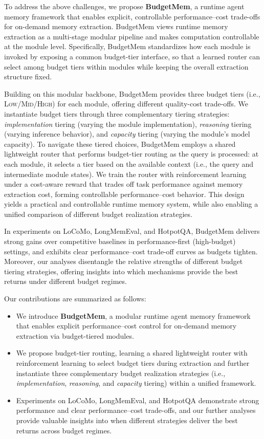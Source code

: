 To address the above challenges, we propose \textbf{BudgetMem}, a runtime agent memory framework that enables explicit, controllable performance–cost trade-offs for on-demand memory extraction. 
BudgetMem views runtime memory extraction as a multi-stage modular pipeline and makes computation controllable at the module level. 
Specifically, BudgetMem standardizes how each module is invoked by exposing a common budget-tier interface, so that a learned router can select among budget tiers within modules while keeping the overall extraction structure fixed.


Building on this modular backbone, BudgetMem provides three budget tiers (i.e., \textsc{Low}/\textsc{Mid}/\textsc{High}) for each module, offering different quality-cost trade-offs. We instantiate budget tiers through three complementary tiering strategies: \textit{implementation} tiering (varying the module implementation), \textit{reasoning} tiering (varying inference behavior), and \textit{capacity} tiering (varying the module's model capacity). To navigate these tiered choices, BudgetMem employs a shared lightweight router that performs budget-tier routing as the query is processed: at each module, it selects a tier based on the available context (i.e., the query and intermediate module states). We train the router with reinforcement learning under a cost-aware reward that trades off task performance against memory extraction cost, forming controllable performance–cost behavior.
This design yields a practical and controllable runtime memory system, while also enabling a unified comparison of different budget realization strategies. 


In experiments on LoCoMo, LongMemEval, and HotpotQA, BudgetMem delivers strong gains over competitive baselines in performance-first (high-budget) settings, and exhibits clear performance–cost trade-off curves as budgets tighten. Moreover, our analyses disentangle the relative strengths of different budget tiering strategies, offering insights into which mechanisms provide the best returns under different budget regimes.




Our contributions are summarized as follows:
\begin{itemize}
\item We introduce \textbf{BudgetMem}, a modular runtime agent memory framework that enables explicit performance--cost control for on-demand memory extraction via budget-tiered modules.
\item We propose budget-tier routing, learning a shared lightweight router with reinforcement learning to select budget tiers during extraction and further instantiate three complementary budget realization strategies (i.e., \textit{implementation}, \textit{reasoning}, and \textit{capacity} tiering) within a unified framework.
\item Experiments on LoCoMo, LongMemEval, and HotpotQA demonstrate strong performance and clear performance--cost trade-offs, and our further analyses provide valuable insights into when different strategies deliver the best returns across budget regimes.
\end{itemize}


